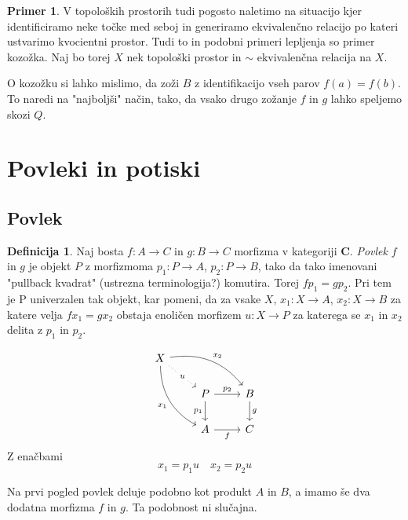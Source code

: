 \documentclass[12pt,a4paper]{book}
\theoremstyle{definition}
\newtheorem{definicija}{Definicija}[chapter]
\theoremstyle{plain}
\theoremstyle{definition}
\newtheorem{primer}{Primer}[section]
\theoremstyle{remark}
\newcommand{\cat}[1]{\textbf{#1}}
\begin{document}
\begin{primer}
V topoloških prostorih tudi pogosto naletimo na situacijo kjer identificiramo neke točke med seboj in generiramo ekvivalenčno relacijo po kateri ustvarimo kvocientni prostor. Tudi to in podobni primeri lepljenja so primer kozožka. Naj bo torej $X$ nek topološki prostor in $\sim$ ekvivalenčna relacija na $X$.
\end{primer}

O kozožku si lahko mislimo, da zoži $B$ z identifikacijo vseh parov $f(a) = f(b)$. To naredi na "najboljši" način, tako, da vsako drugo zožanje $f$ in $g$ lahko speljemo skozi $Q$.


\section{Povleki in potiski}

\subsection{Povlek}

\begin{definicija}
Naj bosta $f : A \to C$ in $g : B \to C$ morfizma v kategoriji $\cat{C}$. \textit{Povlek} $f$ in $g$ je objekt $P$ z morfizmoma $p_1 : P \to A$, $p_2 : P \to B$, tako da tako imenovani "pullback kvadrat" (ustrezna terminologija?) komutira. Torej $fp_1 = gp_2$. Pri tem je P univerzalen tak objekt, kar pomeni, da za vsake $X$, $x_1 : X \to A$, $x_2 : X \to B$ za katere velja $fx_1 = gx_2$ obstaja enoličen morfizem $u : X \to P$ za katerega se $x_1$ in $x_2$ delita z $p_1$ in $p_2$.

$$\begin{tikzcd}
X
\arrow[drr, bend left, "x_2"]
\arrow[ddr, bend right, "x_1"']
\arrow[dr, dotted, "u" description] & & \\
& P \arrow[r, "p_2"] \arrow[d, "p_1"']
& B \arrow[d, "g"] \\
& A \arrow[r, "f"']
& C
\end{tikzcd}$$
Z enačbami
$$x_1 = p_1u \quad x_2 = p_2u$$
\end{definicija}

Na prvi pogled povlek deluje podobno kot produkt $A$ in $B$, a imamo še dva dodatna morfizma $f$ in $g$. Ta podobnost ni slučajna.
\end{document}
